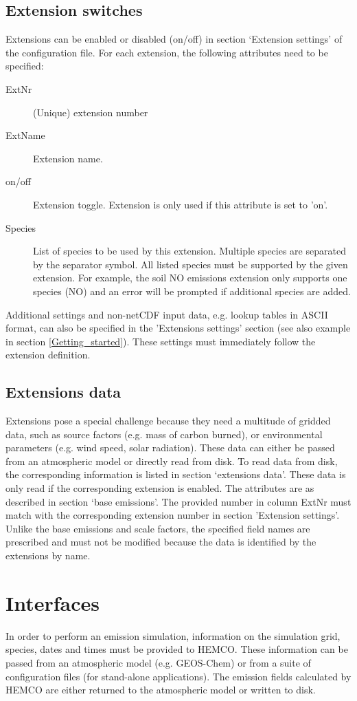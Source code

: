 \documentclass[12pt,a4paper]{article} %
\begin{document}
\subsection{Extension switches}
Extensions can be enabled or disabled (on/off) in section ‘Extension settings’ of the configuration file. For each extension, the following attributes need to be specified:
\begin{description}
\item [ExtNr] (Unique) extension number
\item [ExtName] Extension name.
\item [on/off] Extension toggle. Extension is only used if this attribute is set to 'on'.
\item [Species] List of species to be used by this extension. Multiple species are separated by the separator symbol. All listed species must be supported by the given extension. For example, the soil NO emissions extension only supports one species (NO) and an error will be prompted if additional species are added.
\end{description}
Additional settings and non-netCDF input data, e.g. lookup tables in ASCII format, can also be specified in the 'Extensions settings' section (see also example in section \ref{Getting_started}). These settings must immediately follow the extension definition.

\subsection{Extensions data} \label{Extensions_data}
Extensions pose a special challenge because they need a multitude of gridded data, such as source factors (e.g. mass of carbon burned), or environmental parameters (e.g. wind speed, solar radiation). These data can either be passed from an atmospheric model or directly read from disk. To read data from disk, the corresponding information is listed in section ‘extensions data’. These data is only read if the corresponding extension is enabled. The attributes are as described in section ‘base emissions’. The provided number in column ExtNr must match with the corresponding extension number in section 'Extension settings'. Unlike the base emissions and scale factors, the specified field names are prescribed and must not be modified because the data is identified by the extensions by name.

\section{Interfaces} \label{Interfaces}
In order to perform an emission simulation, information on the simulation grid, species, dates and times must be provided to HEMCO. These information can be passed from an atmospheric model (e.g. GEOS-Chem) or from a suite of configuration files (for stand-alone applications). The emission fields calculated by HEMCO are either returned to the atmospheric model or written to disk.
\end{document}
